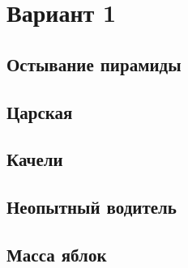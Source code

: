 


\section*{Вариант 1}\firsttrue\secondfalse
\subsection{Остывание пирамиды}
\clearpage
\subsection{Царская}
\clearpage
\subsection{Качели}
\clearpage
\subsection{Неопытный водитель}
\clearpage
\subsection{Масса яблок}
\clearpage

